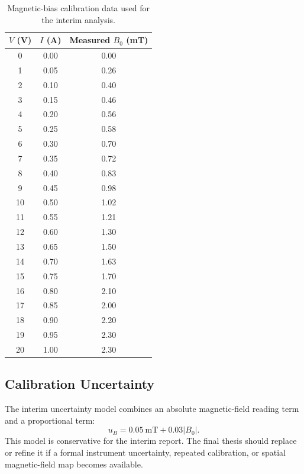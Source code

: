 \documentclass{ieeeaccess}
\begin{document}
\begin{table}[!t]
\caption{Magnetic-bias calibration data used for the interim analysis.}
\label{tab:annex_magnetic_calibration_data}
\centering
\renewcommand{\arraystretch}{1.08}
\begin{tabular}{c c c}
\hline
\textbf{\(V\) (V)} & \textbf{\(I\) (A)} & \textbf{Measured \(B_0\) (mT)} \\
\hline
0  & 0.00 & 0.00 \\
1  & 0.05 & 0.26 \\
2  & 0.10 & 0.40 \\
3  & 0.15 & 0.46 \\
4  & 0.20 & 0.56 \\
5  & 0.25 & 0.58 \\
6  & 0.30 & 0.70 \\
7  & 0.35 & 0.72 \\
8  & 0.40 & 0.83 \\
9  & 0.45 & 0.98 \\
10 & 0.50 & 1.02 \\
11 & 0.55 & 1.21 \\
12 & 0.60 & 1.30 \\
13 & 0.65 & 1.50 \\
14 & 0.70 & 1.63 \\
15 & 0.75 & 1.70 \\
16 & 0.80 & 2.10 \\
17 & 0.85 & 2.00 \\
18 & 0.90 & 2.20 \\
19 & 0.95 & 2.30 \\
20 & 1.00 & 2.30 \\
\hline
\end{tabular}
\end{table}

\subsection{Calibration Uncertainty}
\label{annex:magnetic_uncertainty}

The interim uncertainty model combines an absolute magnetic-field reading term and a proportional term:
\begin{equation}
u_B
=
0.05~\mathrm{mT}
+
0.03|B_0|.
\label{eq:annex_magnetic_uncertainty}
\end{equation}
This model is conservative for the interim report. The final thesis should replace or refine it if a formal instrument uncertainty, repeated calibration, or spatial magnetic-field map becomes available.
\end{document}

